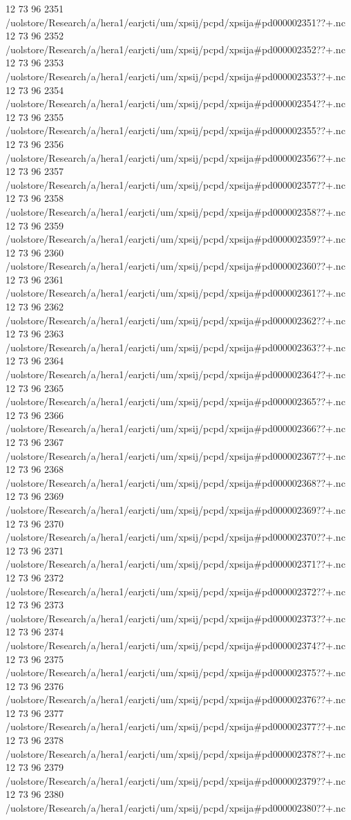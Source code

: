 12 73 96
2351
/uolstore/Research/a/hera1/earjcti/um/xpsij/pcpd/xpsija#pd000002351??+.nc
12 73 96
2352
/uolstore/Research/a/hera1/earjcti/um/xpsij/pcpd/xpsija#pd000002352??+.nc
12 73 96
2353
/uolstore/Research/a/hera1/earjcti/um/xpsij/pcpd/xpsija#pd000002353??+.nc
12 73 96
2354
/uolstore/Research/a/hera1/earjcti/um/xpsij/pcpd/xpsija#pd000002354??+.nc
12 73 96
2355
/uolstore/Research/a/hera1/earjcti/um/xpsij/pcpd/xpsija#pd000002355??+.nc
12 73 96
2356
/uolstore/Research/a/hera1/earjcti/um/xpsij/pcpd/xpsija#pd000002356??+.nc
12 73 96
2357
/uolstore/Research/a/hera1/earjcti/um/xpsij/pcpd/xpsija#pd000002357??+.nc
12 73 96
2358
/uolstore/Research/a/hera1/earjcti/um/xpsij/pcpd/xpsija#pd000002358??+.nc
12 73 96
2359
/uolstore/Research/a/hera1/earjcti/um/xpsij/pcpd/xpsija#pd000002359??+.nc
12 73 96
2360
/uolstore/Research/a/hera1/earjcti/um/xpsij/pcpd/xpsija#pd000002360??+.nc
12 73 96
2361
/uolstore/Research/a/hera1/earjcti/um/xpsij/pcpd/xpsija#pd000002361??+.nc
12 73 96
2362
/uolstore/Research/a/hera1/earjcti/um/xpsij/pcpd/xpsija#pd000002362??+.nc
12 73 96
2363
/uolstore/Research/a/hera1/earjcti/um/xpsij/pcpd/xpsija#pd000002363??+.nc
12 73 96
2364
/uolstore/Research/a/hera1/earjcti/um/xpsij/pcpd/xpsija#pd000002364??+.nc
12 73 96
2365
/uolstore/Research/a/hera1/earjcti/um/xpsij/pcpd/xpsija#pd000002365??+.nc
12 73 96
2366
/uolstore/Research/a/hera1/earjcti/um/xpsij/pcpd/xpsija#pd000002366??+.nc
12 73 96
2367
/uolstore/Research/a/hera1/earjcti/um/xpsij/pcpd/xpsija#pd000002367??+.nc
12 73 96
2368
/uolstore/Research/a/hera1/earjcti/um/xpsij/pcpd/xpsija#pd000002368??+.nc
12 73 96
2369
/uolstore/Research/a/hera1/earjcti/um/xpsij/pcpd/xpsija#pd000002369??+.nc
12 73 96
2370
/uolstore/Research/a/hera1/earjcti/um/xpsij/pcpd/xpsija#pd000002370??+.nc
12 73 96
2371
/uolstore/Research/a/hera1/earjcti/um/xpsij/pcpd/xpsija#pd000002371??+.nc
12 73 96
2372
/uolstore/Research/a/hera1/earjcti/um/xpsij/pcpd/xpsija#pd000002372??+.nc
12 73 96
2373
/uolstore/Research/a/hera1/earjcti/um/xpsij/pcpd/xpsija#pd000002373??+.nc
12 73 96
2374
/uolstore/Research/a/hera1/earjcti/um/xpsij/pcpd/xpsija#pd000002374??+.nc
12 73 96
2375
/uolstore/Research/a/hera1/earjcti/um/xpsij/pcpd/xpsija#pd000002375??+.nc
12 73 96
2376
/uolstore/Research/a/hera1/earjcti/um/xpsij/pcpd/xpsija#pd000002376??+.nc
12 73 96
2377
/uolstore/Research/a/hera1/earjcti/um/xpsij/pcpd/xpsija#pd000002377??+.nc
12 73 96
2378
/uolstore/Research/a/hera1/earjcti/um/xpsij/pcpd/xpsija#pd000002378??+.nc
12 73 96
2379
/uolstore/Research/a/hera1/earjcti/um/xpsij/pcpd/xpsija#pd000002379??+.nc
12 73 96
2380
/uolstore/Research/a/hera1/earjcti/um/xpsij/pcpd/xpsija#pd000002380??+.nc
